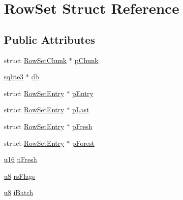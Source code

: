\hypertarget{struct_row_set}{\section{Row\-Set Struct Reference}
\label{struct_row_set}
}
\subsection*{Public Attributes}
\begin{DoxyCompactItemize}
\item 
struct \hyperlink{struct_row_set_chunk}{Row\-Set\-Chunk} $\ast$ \hyperlink{struct_row_set_af064f9ec7b1ba820a3d53622bde9d42f}{p\-Chunk}
\item 
\hyperlink{structsqlite3}{sqlite3} $\ast$ \hyperlink{struct_row_set_a7da847a06c2f90025fbd89c57516c6f6}{db}
\item 
struct \hyperlink{struct_row_set_entry}{Row\-Set\-Entry} $\ast$ \hyperlink{struct_row_set_a3eccaf69ad7863abae2541a7c0b94e1d}{p\-Entry}
\item 
struct \hyperlink{struct_row_set_entry}{Row\-Set\-Entry} $\ast$ \hyperlink{struct_row_set_a040c4b798e6f20d20aa99a45e93b2079}{p\-Last}
\item 
struct \hyperlink{struct_row_set_entry}{Row\-Set\-Entry} $\ast$ \hyperlink{struct_row_set_a7c4e95bd08ff77135068bb3987be5ca1}{p\-Fresh}
\item 
struct \hyperlink{struct_row_set_entry}{Row\-Set\-Entry} $\ast$ \hyperlink{struct_row_set_abe7ab16fffbe5992f637d6a17c6342ff}{p\-Forest}
\item 
\hyperlink{sqlite3_8c_a20f2299e322dcbde37cb07b16910b843}{u16} \hyperlink{struct_row_set_a0ed2a47d6789a70081f3454ef2604e7f}{n\-Fresh}
\item 
\hyperlink{sqlite3_8c_a74a0f6424ae628af25f23f0a35f6ead3}{u8} \hyperlink{struct_row_set_af62438d96429ac10fcbddeb4f6bd9343}{rs\-Flags}
\item 
\hyperlink{sqlite3_8c_a74a0f6424ae628af25f23f0a35f6ead3}{u8} \hyperlink{struct_row_set_af33d206290792936cb1ebbb8e03baf64}{i\-Batch}
\end{DoxyCompactItemize}


